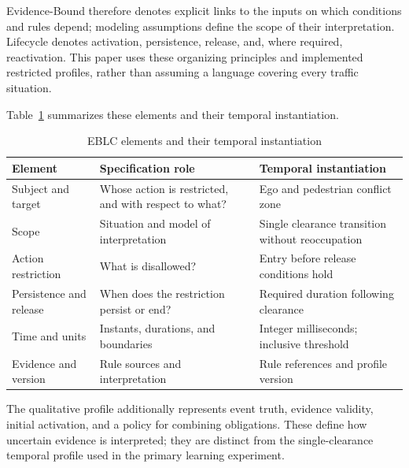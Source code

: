 \documentclass[nolineno]{ieeeaccess}
\begin{document}
Evidence-Bound therefore denotes explicit links to the inputs on which conditions and rules depend; modeling assumptions define the scope of their interpretation. Lifecycle denotes activation, persistence, release, and, where required, reactivation. This paper uses these organizing principles and implemented restricted profiles, rather than assuming a language covering every traffic situation.\par

Table~\ref{tab:eblc-elements} summarizes these elements and their temporal instantiation.\par


\begin{table}[tp]\caption{EBLC elements and their temporal instantiation}\label{tab:eblc-elements}
\centering\fontsize{8}{10}\selectfont\setlength{\tabcolsep}{3pt}
\begin{tabular}{@{}>{\raggedright\arraybackslash}p{}>{\raggedright\arraybackslash}p{}>{\raggedright\arraybackslash}p{}@{}}
\toprule
\textbf{Element} & \textbf{Specification role} & \textbf{Temporal instantiation}\\
\midrule
Subject and target & Whose action is restricted, and with respect to what? & Ego and pedestrian conflict zone\\[3pt]
Scope & Situation and model of interpretation & Single clearance transition without reoccupation\\[3pt]
Action restriction & What is disallowed? & Entry before release conditions hold\\[3pt]
Persistence and release & When does the restriction persist or end? & Required duration following clearance\\[3pt]
Time and units & Instants, durations, and boundaries & Integer milliseconds; inclusive threshold\\[3pt]
Evidence and version & Rule sources and interpretation & Rule references and profile version\\[3pt]
\bottomrule\end{tabular}
\end{table}

The qualitative profile additionally represents event truth, evidence validity, initial activation, and a policy for combining obligations. These define how uncertain evidence is interpreted; they are distinct from the single-clearance temporal profile used in the primary learning experiment.\par
\end{document}
